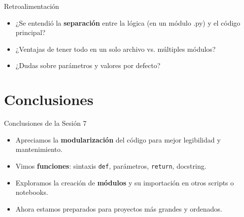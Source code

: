 \documentclass[10pt]{beamer}
\begin{document}
\begin{frame}{Retroalimentación}
  \begin{itemize}
    \item ¿Se entendió la \textbf{separación} entre la lógica (en un módulo .py) y el código principal?
    \item ¿Ventajas de tener todo en un solo archivo vs. múltiples módulos?
    \item ¿Dudas sobre parámetros y valores por defecto?
  \end{itemize}
\end{frame}

\section{Conclusiones}

\begin{frame}{Conclusiones de la Sesión 7}
  \begin{itemize}
    \item Apreciamos la \textbf{modularización} del código para mejor legibilidad y mantenimiento.
    \item Vimos \textbf{funciones}: sintaxis \texttt{def}, parámetros, \texttt{return}, docstring.
    \item Exploramos la creación de \textbf{módulos} y su importación en otros scripts o notebooks.
    \item Ahora estamos preparados para proyectos más grandes y ordenados.
  \end{itemize}
\end{frame}
\end{document}
